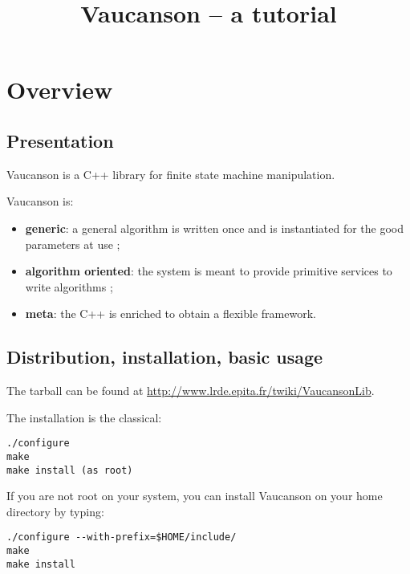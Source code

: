 \documentclass{article}
\begin{document}
\title{Vaucanson -- a tutorial}

\maketitle
\tableofcontents

\section{Overview}

\subsection{Presentation}

Vaucanson is a C++ library for finite state machine manipulation. 

Vaucanson is:

\begin{itemize}
  
\item \textbf{generic}: a general algorithm is written once and is
  instantiated for the good parameters at use ;
  
\item \textbf{algorithm oriented}: the system is meant to provide
  primitive services to write algorithms ;

\item \textbf{meta}: the C++ is enriched to obtain a flexible framework.

\end{itemize}

\subsection{Distribution, installation, basic usage}

The tarball can be found at \url{http://www.lrde.epita.fr/twiki/VaucansonLib}.

The installation is the classical:

\begin{verbatim}
./configure
make
make install (as root)
\end{verbatim}

If you are not root on your system, you can install Vaucanson on your
home directory by typing:

\begin{verbatim}
./configure --with-prefix=$HOME/include/ 
make
make install
\end{verbatim} %
\end{document}
